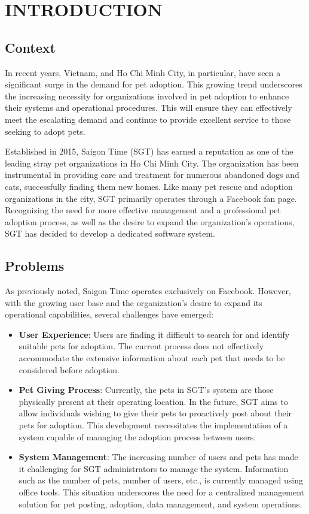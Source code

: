 
\chapter{INTRODUCTION}
\section{Context}
In recent years, Vietnam, and Ho Chi Minh City, in particular, have seen a significant surge in the demand for pet adoption. This growing trend underscores the increasing necessity for organizations involved in pet adoption to enhance their systems and operational procedures. This will ensure they can effectively meet the escalating demand and continue to provide excellent service to those seeking to adopt pets.

Established in 2015, Saigon Time (SGT) has earned a reputation as one of the leading stray pet organizations in Ho Chi Minh City. The organization has been instrumental in providing care and treatment for numerous abandoned dogs and cats, successfully finding them new homes. Like many pet rescue and adoption organizations in the city, SGT primarily operates through a Facebook fan page. Recognizing the need for more effective management and a professional pet adoption process, as well as the desire to expand the organization’s operations, SGT has decided to develop a dedicated software system.

\section{Problems}

As previously noted, Saigon Time operates exclusively on Facebook. However, with the growing user base and the organization’s desire to expand its operational capabilities, several challenges have emerged:
\begin{itemize}
    \item \textbf{User Experience}: Users are finding it difficult to search for and identify suitable pets for adoption. The current process does not effectively accommodate the extensive information about each pet that needs to be considered before adoption.
    \item \textbf{Pet Giving Process}: Currently, the pets in SGT’s system are those physically present at their operating location. In the future, SGT aims to allow individuals wishing to give their pets to proactively post about their pets for adoption. This development necessitates the implementation of a system capable of managing the adoption process between users.
    \item \textbf{System Management}: The increasing number of users and pets has made it challenging for SGT administrators to manage the system. Information such as the number of pets, number of users, etc., is currently managed using office tools. This situation underscores the need for a centralized management solution for pet posting, adoption, data management, and system operations.
\end{itemize}


